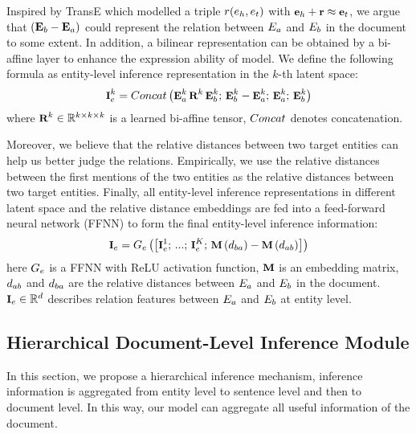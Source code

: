 \documentclass[runningheads]{llncs}
\begin{document}
Inspired by TransE \cite{bordes2013translating} which modelled a triple $\small r({e}_{h}, {e}_{t})$ with $\small \textbf{e}_{h} + \textbf{r} \approx \textbf{e}_{t}$, we argue that $\small (\mathbf{E}_{b} - \mathbf{E}_{a})$ could represent the relation between $\small E_{a}$ and $\small E_{b}$ in the document to some extent.
In addition, a bilinear representation can be obtained by a bi-affine layer to enhance the expression ability of model.
We define the following formula as entity-level inference representation in the $k$-th latent space:
\begin{equation}
\small
\textbf{I}_{e}^{k}={Concat}\left(\textbf{E}_{a}^{k} \, \textbf{R}^{k} \, \textbf{E}_{b}^{k} ; \, \textbf{E}_{b}^{k} - \textbf{E}_{a}^{k} ; \, \textbf{E}_{a}^{k} ; \, \textbf{E}_{b}^{k}\right)
\end{equation}
where $\small \textbf{R}^{k}\in \mathbb{R}^{k \times k \times k}$ is a learned bi-affine tensor, $\small {Concat}$ denotes concatenation.

Moreover, we believe that the relative distances between two target entities can help us better judge the relations. 
Empirically, we use the relative distances between the first mentions of the two entities as the relative distances between two target entities. Finally, all entity-level inference representations in different latent space and the relative distance embeddings are fed into a feed-forward neural network (FFNN) to form the final entity-level inference information:
\begin{equation}
\small
\textbf{I}_{e}=G_{e}\left(\left[\textbf{I}_{e}^{1} ; \, ... ; \, \textbf{I}_{e}^{K} ; \, \textbf{M}\left(d_{b a}\right) - \textbf{M}\left(d_{a b}\right) \right]\right)
\end{equation}
here $\small G_{e}$ is a FFNN with ReLU activation function, $\small \textbf{M}$ is an embedding matrix, $\small d_{a b}$ and $\small d_{b a}$ are the relative distances between $\small E_{a}$ and $\small E_{b}$ in the document.
$\small \textbf{I}_{e} \in \mathbb{R}^{d}$ describes relation features between $\small E_{a}$ and $\small E_{b}$ at entity level. 

\subsection{Hierarchical Document-Level Inference Module}
In this section, we propose a hierarchical inference mechanism, inference information is aggregated from entity level to sentence level and then to document level.
In this way, our model can aggregate all useful information of the document.
\end{document}
